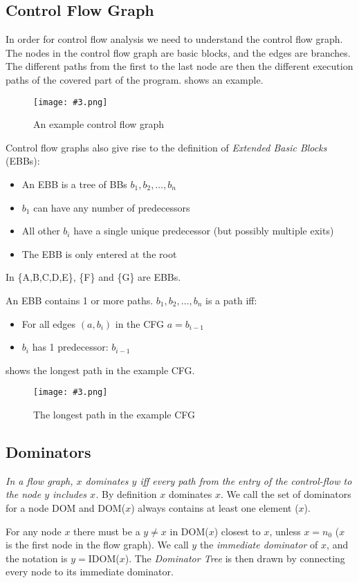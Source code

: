\documentclass{article}
\newcommand{\fig}[4]{
	\begin{figure}[#1]
		\center
		\texttt{[image: \#3.png]}
		\caption{#4}
		\label{fig:#3}
	\end{figure}
	}
\begin{document}
\subsection{Control Flow Graph}
\label{cfg}
In order for control flow analysis we need to understand the control flow graph.
The nodes in the control flow graph are basic blocks, and the edges are branches.
The different paths from the first to the last node are then the different execution paths of the covered part of the program.
 shows an example.

\fig{h}{0.7}{cfg}{An example control flow graph}

Control flow graphs also give rise to the definition of \emph{Extended Basic Blocks} (EBBs):
\begin{itemize}
	\item An EBB is a tree of BBs $b_1,b_2,\dots,b_n$
	\item $b_1$ can have any number of predecessors
	\item All other $b_i$ have a single unique predecessor (but possibly multiple exits)
	\item The EBB is only entered at the root
\end{itemize}
In  \{A,B,C,D,E\}, \{F\} and \{G\} are EBBs.

An EBB contains 1 or more paths.
$b_1,b_2,\dots,b_n$ is a path iff:
\begin{itemize}
	\item For all edges $(a, b_i)$ in the CFG $a=b_{i-1}$
	\item $b_i$ has 1 predecessor: $b_{i-1}$
\end{itemize}
 shows the longest path in the example CFG.

\fig{h}{0.7}{path}{The longest path in the example CFG}

\subsection{Dominators}
\emph{In a flow graph, $x$ dominates $y$ iff every path from the entry of the control-flow to the node $y$ includes $x$.}
By definition $x$ dominates $x$.
We call the set of dominators for a node DOM and DOM($x$) always contains at least one element ($x$).

For any node $x$ there must be a $y \neq x$ in DOM($x$) closest to $x$, unless $x=n_0$ ($x$ is the first node in the flow graph).
We call $y$ the \emph{immediate dominator} of $x$, and the notation is $y=$IDOM($x$).
The \emph{Dominator Tree} is then drawn by connecting every node to its immediate dominator.
\end{document}
